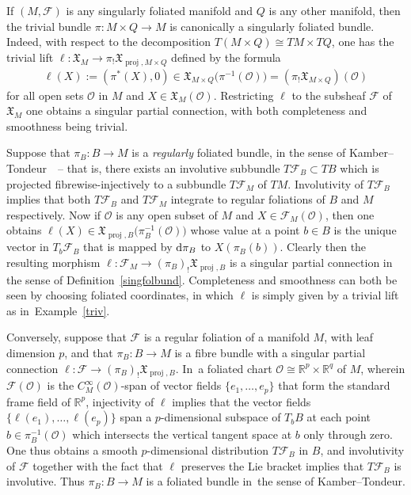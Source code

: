 \documentclass[pdftex]{sigma}
\numberwithin{equation}{section}
\def\proj{\operatorname{proj}}
\def\FF{{\mathcal{F}}}
\def\OO{{\mathcal{O}}}
\def\RB{{\mathbb{R}}}
\def\XF{{\mathfrak{X}}}
\begin{document}
\begin{Example}\label{triv}
If $(M,\FF)$ is any singularly foliated manifold and $Q$ is any other manifold, then the trivial bundle $\pi\colon M\times Q\rightarrow M$ is canonically a singularly foliated bundle. Indeed, with respect to the decomposition $T(M\times Q)\cong TM\times TQ$, one has the trivial lift $\ell\colon \XF_{M}\rightarrow\pi_{!}\XF_{\proj,M\times Q}$ defined by the formula
\begin{gather*}
\ell(X):=(\pi^{*}(X),0)\in\XF_{M\times Q}\big(\pi^{-1}(\OO)\big) = (\pi_{!}\XF_{M\times Q})(\OO)
\end{gather*}
for all open sets $\OO$ in $M$ and $X\in\XF_{M}(\OO)$. Restricting $\ell$ to the subsheaf $\FF$ of $\XF_{M}$ one obtains a singular partial connection, with both completeness and smoothness being trivial.
\end{Example}

\begin{Example}\label{regex}
Suppose that $\pi_{B}\colon B\rightarrow M$ is a \textit{regularly} foliated bundle, in the sense of Kamber--Tondeur~\cite[Definition~2.1]{folbund}~-- that is, there exists an involutive subbundle $T\FF_{B}\subset TB$ which is projected fibrewise-injectively to a subbundle $T\FF_{M}$ of $TM$. Involutivity of $T\FF_{B}$ implies that both $T\FF_{B}$ and $T\FF_{M}$ integrate to regular foliations of $B$ and $M$ respectively. Now if $\OO$ is any open subset of $M$ and $X\in\FF_{M}(\OO)$, then one obtains $\ell(X)\in\XF_{\proj,B}\big(\pi_{B}^{-1}(\OO)\big)$ whose value at a point $b\in B$ is the unique vector in $T_{b}\FF_{B}$ that is mapped by ${\rm d}\pi_{B}$ to $X(\pi_{B}(b))$. Clearly then the resulting morphism $\ell\colon \FF_{M}\rightarrow(\pi_{B})_{!}\XF_{\proj,B}$ is a singular partial connection in the sense of Definition~\ref{singfolbund}. Completeness and smoothness can both be seen by choosing foliated coordinates, in which $\ell$ is simply given by a trivial lift as in~Example~\ref{triv}.

Conversely, suppose that $\FF$ is a regular foliation of a manifold $M$, with leaf dimension $p$, and that $\pi_{B}\colon B\rightarrow M$ is a fibre bundle with a singular partial connection $\ell\colon \FF\rightarrow(\pi_{B})_{!}\XF_{\proj,B}$. In~a foliated chart $\OO\cong\RB^{p}\times\RB^{q}$ of $M$, wherein $\FF(\OO)$ is the $C^{\infty}_{M}(\OO)$-span of vector fields $\{e_{1},\dots,e_{p}\}$ that form the standard frame field of $\RB^{p}$, injectivity of $\ell$ implies that the vector fields $\{\ell(e_{1}),\dots,\ell(e_{p})\}$ span a $p$-dimensional subspace of $T_{b}B$ at each point $b\in\pi_{B}^{-1}(\OO)$ which intersects the vertical tangent space at $b$ only through zero. One thus obtains a smooth $p$-dimensional distribution $T\FF_{B}$ in $B$, and involutivity of $\FF$ together with the fact that $\ell$ preserves the Lie bracket implies that $T\FF_{B}$ is involutive. Thus $\pi_{B}\colon B\rightarrow M$ is a foliated bundle in~the sense of Kamber--Tondeur.
\end{Example}
\end{document}
